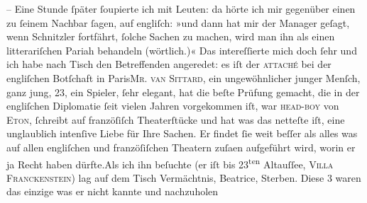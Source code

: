 \begin{ledgroupsized}[t]{13cm}
           \pstart
           \numberlinefalse{}\centering{}–\numberlinetrue{}\pend
           \pstart
           \noindent{}Eine Stunde ſpäter ſoupierte ich mit Leuten: da hörte ich mir gegenüber einen  zu ſeinem Nachbar ſagen, auf engliſch: »und dann
               hat mir der Manager geſagt, wenn Schnitzler fortfährt, {\pb}ſolche Sachen zu machen, wird man
               ihn als einen litterariſchen Pariah behandeln (wörtlich.)« Das intereſſierte mich
               doch ſehr und ich habe nach Tisch den Betreffenden angeredet: es iſt der \textsc{attaché} bei der engliſchen
                  Botſchaft in Paris\textsc{Mr. van Sittard}, ein ungewöhnlicher junger Menſch, ganz jung, 23, ein Spieler, ſehr elegant,
               hat die beſte Prüfung gemacht, die in {\pb}der engliſchen Diplomatie ſeit
               vielen Jahren vorgekommen iſt, war \textsc{head-boy} von \textsc{Eton}, ſchreibt auf franzöſiſch Theaterſtücke und hat was das netteſte iſt, eine
               unglaublich intenſive Liebe für Ihre Sachen. Er findet ſie weit beſſer als alles was
               auf allen engliſchen und franzöſiſchen Theatern zuſa{\geminationm}en
               aufgeführt wird, worin er ja Recht haben dürfte.\hspace*{1.5em}Als
               ich ihn beſuchte (er {\pb}iſt bis
                     23\textsuperscript{ten}{ }Altauſſee, \textsc{Villa
                     Franckenſtein}) lag auf dem Tisch Vermächtnis, Beatrice, Sterben. Diese 3 waren das einzige was er nicht kannte und nachzuholen

\end{ledgroupsized}

